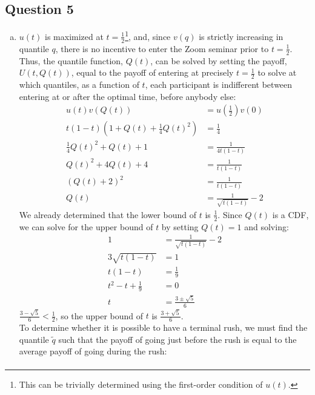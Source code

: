 \documentclass{article}
\begin{document}
\pagebreak
\subsection*{Question 5}

\begin{enumerate}[(a)]
	\item $u(t)$ is maximized at $t=\frac{1}{2}$\footnote{This can be trivially determined using the first-order condition of $u(t)$.}, and, since $v(q)$ is strictly increasing in quantile $q$, there is no incentive to enter the Zoom seminar prior to ${t=\frac{1}{2}}$. Thus, the quantile function, $Q(t)$, can be solved by setting the payoff, $U(t,Q(t))$, equal to the payoff of entering at precisely ${t=\frac{1}{2}}$ to solve at which quantiles, as a function of $t$, each participant is indifferent between entering at or after the optimal time, before anybody else:
		\begin{align*}
			u(t)v(Q(t)) &= u\left(\frac{1}{2}\right)v(0)	\\
			t(1-t)\left(1 + Q(t) + \frac{1}{4}Q(t)^2\right) &= \frac{1}{4} \\
			\frac{1}{4}Q(t)^2 + Q(t)   + 1 &= \frac{1}{4t(1-t)} \\
			Q(t)^2 + 4Q(t) + 4 &= \frac{1}{t(1-t)} \\
			\left(Q(t) + 2\right)^2 &= \frac{1}{t(1-t)} \\
			Q(t) &= \frac{1}{\sqrt{t(1-t)}}	- 2
		\end{align*}
		We already determined that the lower bound of $t$ is $\frac{1}{2}$. Since $Q(t)$ is a CDF, we can solve for the upper bound of $t$ by setting ${Q(t)=1}$ and solving:
		\begin{align*}
			1 &= \frac{1}{\sqrt{t(1-t)}}- 2	\\
			3\sqrt{t(1-t)} &= 1					\\
			t(1-t) &= \frac{1}{9}	\\
			t^2 - t + \frac{1}{9} &= 0	\\
			t &= \frac{3 \pm \sqrt{5}}{6}
		\end{align*}
		$\frac{3 - \sqrt{5}}{6}<\frac{1}{2}$, so the upper bound of $t$ is $\frac{3 + \sqrt{5}}{6}$.
		\smallskip \\
		To determine whether it is possible to have a terminal rush, we must find the quantile $\tilde{q}$ such that the payoff of going just before the rush is equal to the average payoff of going during the rush:
		\begin{align*}

\end{align*}
\end{enumerate}
\end{document}
